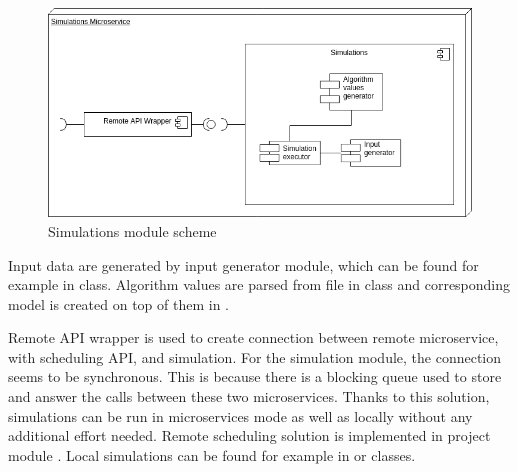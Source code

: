 \begin{figure}[ht]
    \includegraphics[width=\textwidth]{i_simulations.png}
    \centering
    \caption{Simulations module scheme}
    \label{fig:simulations-arch}
\end{figure}

Input data are generated by input generator module,
which can be found for example in  class.
Algorithm values are parsed from file in class  
and corresponding model is created on top of them in .

Remote API wrapper is used to create connection between remote microservice, with scheduling API, and simulation.
For the simulation module,
the connection seems to be synchronous.
This is because there is a blocking queue used to store and answer the calls between these two microservices.
Thanks to this solution,
simulations can be run in microservices mode as well as locally without any additional effort needed.
Remote scheduling solution is implemented in project module .
Local simulations can be found for example in  or  classes.